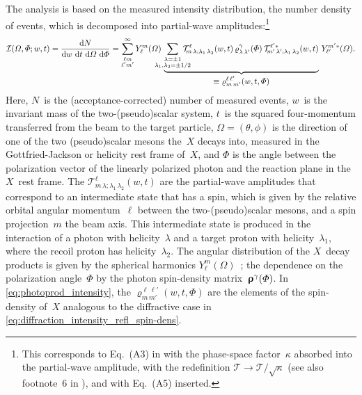 The analysis is based on the measured intensity distribution, \ie the
number density of events, which is decomposed into partial-wave
amplitudes:\footnote{This corresponds to Eq.~(A3) in
 with the phase-space factor~$\kappa$
absorbed into the partial-wave amplitude, \ie with the redefinition
$\mathcal{T} \to \mathcal{T} / \sqrt{\kappa}$ (see also footnote~6 in
), and with Eq.~(A5) inserted.}
\begin{equation}
  \mathcal{I}(\Omega, \Phi; w, t)
  = \frac{\dif{N}}{\dif{w}\, \dif{t}\, \dif{\Omega}\, \dif{\Phi}}
  = \sum_{\substack{\ell m \\ \ell' m'}}^\infty
  Y_\ell^m(\Omega)~
  \dUnderbrace{\sum_{\substack{\lambda = \pm 1 \\ \mathclap{\lambda_1, \lambda_2 = \pm 1/2}}}
  \mathcal{T}^\ell_{\!m\, \lambda; \lambda_1\, \lambda_2}(w, t)\,
  \varrho^\gamma_{\lambda\, \lambda'}(\Phi)\,
  \mathcal{T}^{\ell' *}_{\!m'\, \lambda'; \lambda_1\, \lambda_2}(w, t)}{\equiv \varrho^{\ell\, \ell'}_{m\, m'}(w, t, \Phi)}~
  Y_{\ell'}^{m' *}(\Omega).
\end{equation}
Here, $N$~is the (acceptance-corrected) number of measured events,
$w$~is the invariant mass of the two-(pseudo)scalar system, $t$~is the
squared four-momentum transferred from the beam to the target
particle, $\Omega = (\theta, \phi)$ is the direction of one of the two
(pseudo)scalar mesons the~$X$ decays into, measured in the
Gottfried-Jackson or helicity rest frame of~$X$, and $\Phi$ is the
angle between the polarization vector of the linearly polarized photon
and the reaction plane in the $X$~rest frame.  The
$\mathcal{T}^\ell_{\!m\, \lambda; \lambda_1\, \lambda_2}(w, t)$ are
the partial-wave amplitudes that correspond to an intermediate state
that has a spin, which is given by the relative orbital angular
momentum~$\ell$ between the two-(pseudo)scalar mesons, and a spin
projection~$m$ \wrt the beam axis.  This intermediate state is
produced in the interaction of a photon with helicity~$\lambda$ and a
target proton with helicity~$\lambda_1$, where the recoil proton has
helicity~$\lambda_2$.  The angular distribution of the $X$~decay
products is given by the spherical harmonics
$Y_\ell^m(\Omega)$~\cite{wikipedia:sphericalHarm}; the dependence on
the polarization angle~$\Phi$ by the photon spin-density
matrix~$\bm{\mathrm{\upvarrho}}^\gamma(\Phi)$.  In
\cref{eq:photoprod_intensity}, the $\varrho^{\ell\, \ell'}_{m\, m'}(w,
t, \Phi)$ are the elements of the spin-density of~$X$ analogous to the
diffractive case in \cref{eq:diffraction_intensity_refl_spin-dens}.

